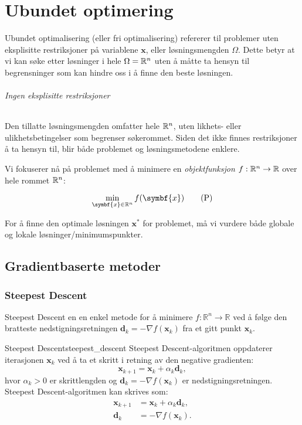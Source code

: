 \part{Ubundet optimering}
\label{part:unconstrained_optimization}

Ubundet optimalisering (eller fri optimalisering) refererer til problemer uten eksplisitte restriksjoner på variablene \(\symbf{x}\), eller løsningsmengden \(\Omega\).
Dette betyr at vi kan søke etter løsninger i hele \(\Omega = \mathbb{R}^n\) uten å måtte ta hensyn til begrensninger som kan hindre oss i å finne den beste løsningen.

\paragraph{Ingen eksplisitte restriksjoner}
Den tillatte løsningsmengden omfatter hele \(\mathbb{R}^n\), uten likhets- eller ulikhetsbetingelser som begrenser søkerommet.
Siden det ikke finnes restriksjoner å ta hensyn til, blir både problemet og løsningsmetodene enklere.

Vi fokuserer nå på problemet med å minimere en \textit{objektfunksjon} \( f : \mathbb{R}^n \to \mathbb{R} \) over hele rommet \(\mathbb{R}^n\):

\[
	\min_{\symbf{x} \in \R^n} f(\symbf{x}) \tag{P} \label{eq:global_minimization_problem}
\]

For å finne den optimale løsningen \(\symbf{x}^\ast\) for problemet, må vi vurdere både globale og lokale løsninger/minimumspunkter.

\chapter{Gradientbaserte metoder}

\section{Steepest Descent}
\label{sec:steepest_descent}
Steepest Descent en en enkel metode for å minimere \(f: \mathbb{R}^n \to \mathbb{R}\) ved å følge den bratteste nedstigningsretningen \( \symbf{d}_k = -\nabla f(\symbf{x}_k)\) fra et gitt punkt \( \symbf{x}_k \).
\begin{definition}{Steepest Descent}{steepest_descent}
	Steepest Descent-algoritmen oppdaterer iterasjonen \( \symbf{x}_k \) ved å ta et skritt i retning av den negative gradienten:
	\[
		\symbf{x}_{k+1} = \symbf{x}_k + \alpha_k \symbf{d}_k,
	\]
	hvor \( \alpha_k > 0 \) er skrittlengden og \( \symbf{d}_k = -\nabla f(\symbf{x}_k) \) er nedstigningsretningen.
	\medskip
	Steepest Descent-algoritmen kan skrives som:
	\begin{align*}
		\symbf{x}_{k+1} & = \symbf{x}_k + \alpha_k \symbf{d}_k, \\
		\symbf{d}_k     & = -\nabla f(\symbf{x}_k).
	\end{align*}

\end{definition}

